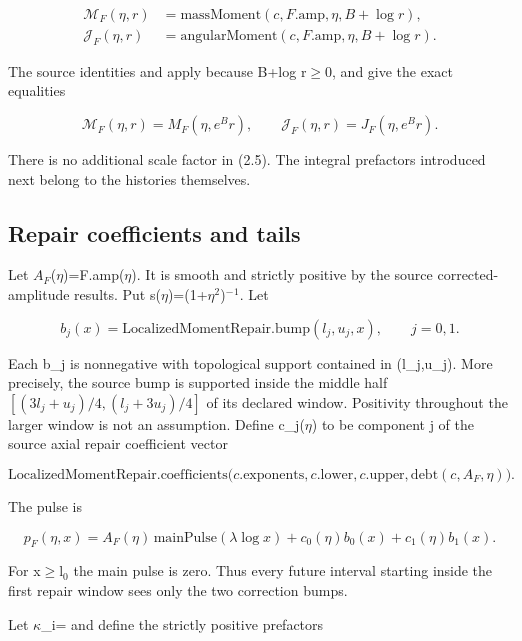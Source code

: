 \documentclass[11pt,a4paper]{article}
\begin{document}
\[
\begin{aligned}
\mathcal M_F(\eta,r)&=\mathrm{massMoment}(c,F.\mathrm{amp},\eta,B+\log r),\\
\mathcal J_F(\eta,r)&=\mathrm{angularMoment}(c,F.\mathrm{amp},\eta,B+\log r).
\end{aligned}
\]

The source identities  and  apply because B+log r\ensuremath{\ge}0, and give the exact equalities

\[
\mathcal M_F(\eta,r)=M_F(\eta,e^B r),\qquad
\mathcal J_F(\eta,r)=J_F(\eta,e^B r). \tag{2.5}
\]

There is no additional scale factor in (2.5). The integral prefactors introduced next belong to the histories themselves.

\subsection{Repair coefficients and tails}

Let \(A_F\)(\ensuremath{\eta})=F.amp(\ensuremath{\eta}). It is smooth and strictly positive by the source corrected-amplitude results. Put s(\ensuremath{\eta})=(1+\ensuremath{\eta}\ensuremath{{}^{2}})\ensuremath{{}^{-}}\ensuremath{{}^{1}}. Let

\[
b_j(x)=\mathrm{LocalizedMomentRepair.bump}(l_j,u_j,x),\qquad j=0,1.
\]

Each b\_j is nonnegative with topological support contained in (l\_j,u\_j). More precisely, the source bump is supported inside the middle half
\([(3l_j+u_j)/4,(l_j+3u_j)/4]\) of its declared window. Positivity throughout the larger window is not an assumption. Define c\_j(\ensuremath{\eta}) to be component j of the source axial repair coefficient vector

\[
\mathrm{LocalizedMomentRepair.coefficients}
\bigl(c.\mathrm{exponents},c.\mathrm{lower},c.\mathrm{upper},
\mathrm{debt}(c,A_F,\eta)\bigr).
\]

The pulse is

\[
p_F(\eta,x)=A_F(\eta)\,\mathrm{mainPulse}(\lambda\log x)
               +c_0(\eta)b_0(x)+c_1(\eta)b_1(x). \tag{2.6}
\]

For x\ensuremath{\ge}l\ensuremath{{}_0} the main pulse is zero. Thus every future interval starting inside the first repair window sees only the two correction bumps.

Let \ensuremath{\kappa}\_i= and define the strictly positive prefactors
\end{document}
